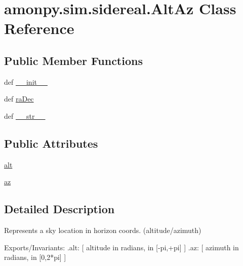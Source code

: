 \hypertarget{classamonpy_1_1sim_1_1sidereal_1_1_alt_az}{\section{amonpy.\-sim.\-sidereal.\-Alt\-Az Class Reference}
\label{classamonpy_1_1sim_1_1sidereal_1_1_alt_az}
}
\subsection*{Public Member Functions}
\begin{DoxyCompactItemize}
\item 
def \hyperlink{classamonpy_1_1sim_1_1sidereal_1_1_alt_az_a7a0a615ddafe505b5fbc4de2a340b265}{\-\_\-\-\_\-init\-\_\-\-\_\-}
\item 
def \hyperlink{classamonpy_1_1sim_1_1sidereal_1_1_alt_az_aa780a43b312be8d04e5ed4a4e0e496a0}{ra\-Dec}
\item 
def \hyperlink{classamonpy_1_1sim_1_1sidereal_1_1_alt_az_aa75e8de94e7423f5a46310a99c59de2d}{\-\_\-\-\_\-str\-\_\-\-\_\-}
\end{DoxyCompactItemize}
\subsection*{Public Attributes}
\begin{DoxyCompactItemize}
\item 
\hyperlink{classamonpy_1_1sim_1_1sidereal_1_1_alt_az_a83fa807a0712e96e75f710d795130909}{alt}
\item 
\hyperlink{classamonpy_1_1sim_1_1sidereal_1_1_alt_az_a6ab14f1c259aa771a74bd004ae99e1ce}{az}
\end{DoxyCompactItemize}


\subsection{Detailed Description}
\begin{DoxyVerb}Represents a sky location in horizon coords. (altitude/azimuth)

  Exports/Invariants:
    .alt:   [ altitude in radians, in [-pi,+pi] ]
    .az:    [ azimuth in radians, in [0,2*pi] ]
\end{DoxyVerb}
 


